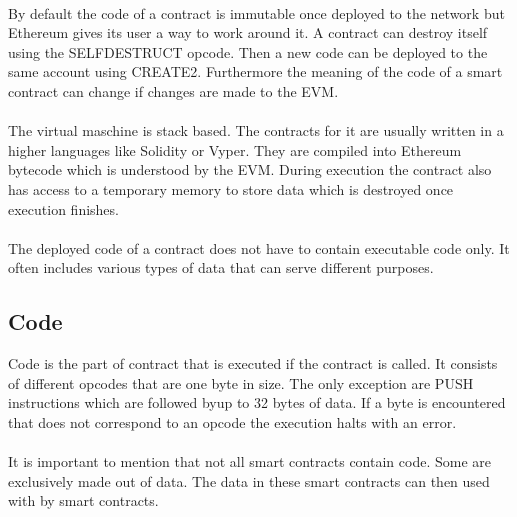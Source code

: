 \documentclass{article}
\begin{document}
\paragraph{}
    By default the code of a contract is immutable once deployed to the network but Ethereum gives its user a way to work around it. A contract can destroy itself using the SELFDESTRUCT opcode. Then a new code can be deployed to the same account using CREATE2. Furthermore the meaning of the code of a smart contract can change if changes are made to the EVM.
\paragraph{}
    The virtual maschine is stack based. The contracts for it are usually written in a higher languages like Solidity\cite{solidity} or Vyper\cite{vyper}. They are compiled into Ethereum bytecode which is understood by the EVM. During execution the contract also has access to a temporary memory to store data which is destroyed once execution finishes. 

\paragraph{}
    The deployed code of a contract does not have to contain executable code only. It often includes various types of data that can serve different purposes.

\subsection{Code}

    Code is the part of contract that is executed if the contract is called. It consists of different opcodes that are one byte in size. The only exception are PUSH instructions which are followed byup to 32 bytes of data. If a byte is encountered that does not correspond to an opcode the execution halts with an error.

\paragraph{}
    It is important to mention that not all smart contracts contain code. Some are exclusively made out of data. The data in these smart contracts can then used with by smart contracts.
\end{document}

